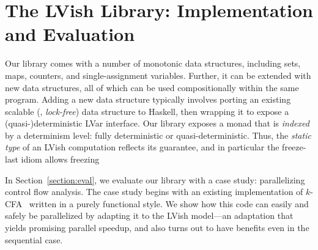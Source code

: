 \chapter{The LVish Library: Implementation and Evaluation\label{ch:lvish}} %






Our library comes with a number of monotonic data structures,
including sets, maps, counters, and single-assignment variables.
Further, it can be extended with new data structures, all of which can
be used compositionally within the same program.  Adding a new data
structure typically involves porting an existing scalable (\eg, {\em
  lock-free}) data structure to Haskell, then wrapping it to expose a
(quasi-)deterministic LVar interface.  Our library exposes a monad
that is \emph{indexed} by a determinism level: fully deterministic or
quasi-deterministic.  Thus, the \emph{static type} of an LVish
computation reflects its guarantee, and in particular the freeze-last
idiom allows freezing
 
In Section~\ref{section:eval}, we evaluate our library with a case
study: parallelizing control flow analysis.  The case study begins
with an existing implementation of $k$-CFA~\cite{MightkCFABlog}
written in a purely functional style.  We show how this code can
easily and safely be parallelized by adapting it to the LVish
model---an adaptation that yields promising parallel speedup, and also
turns out to have benefits even in the sequential case.





